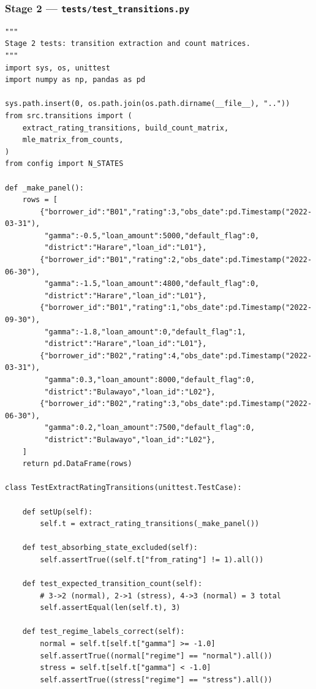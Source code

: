 \documentclass[12pt,a4paper]{article}
\begin{document}
\subsubsection{Stage 2 --- \texttt{tests/test\_transitions.py}}

\begin{lstlisting}[caption={test\_transitions.py --- Stage 2: Transition Extraction}]
"""
Stage 2 tests: transition extraction and count matrices.
"""
import sys, os, unittest
import numpy as np, pandas as pd

sys.path.insert(0, os.path.join(os.path.dirname(__file__), ".."))
from src.transitions import (
    extract_rating_transitions, build_count_matrix,
    mle_matrix_from_counts,
)
from config import N_STATES

def _make_panel():
    rows = [
        {"borrower_id":"B01","rating":3,"obs_date":pd.Timestamp("2022-03-31"),
         "gamma":-0.5,"loan_amount":5000,"default_flag":0,
         "district":"Harare","loan_id":"L01"},
        {"borrower_id":"B01","rating":2,"obs_date":pd.Timestamp("2022-06-30"),
         "gamma":-1.5,"loan_amount":4800,"default_flag":0,
         "district":"Harare","loan_id":"L01"},
        {"borrower_id":"B01","rating":1,"obs_date":pd.Timestamp("2022-09-30"),
         "gamma":-1.8,"loan_amount":0,"default_flag":1,
         "district":"Harare","loan_id":"L01"},
        {"borrower_id":"B02","rating":4,"obs_date":pd.Timestamp("2022-03-31"),
         "gamma":0.3,"loan_amount":8000,"default_flag":0,
         "district":"Bulawayo","loan_id":"L02"},
        {"borrower_id":"B02","rating":3,"obs_date":pd.Timestamp("2022-06-30"),
         "gamma":0.2,"loan_amount":7500,"default_flag":0,
         "district":"Bulawayo","loan_id":"L02"},
    ]
    return pd.DataFrame(rows)

class TestExtractRatingTransitions(unittest.TestCase):

    def setUp(self):
        self.t = extract_rating_transitions(_make_panel())

    def test_absorbing_state_excluded(self):
        self.assertTrue((self.t["from_rating"] != 1).all())

    def test_expected_transition_count(self):
        # 3->2 (normal), 2->1 (stress), 4->3 (normal) = 3 total
        self.assertEqual(len(self.t), 3)

    def test_regime_labels_correct(self):
        normal = self.t[self.t["gamma"] >= -1.0]
        self.assertTrue((normal["regime"] == "normal").all())
        stress = self.t[self.t["gamma"] < -1.0]
        self.assertTrue((stress["regime"] == "stress").all())


\end{lstlisting}
\end{document}
